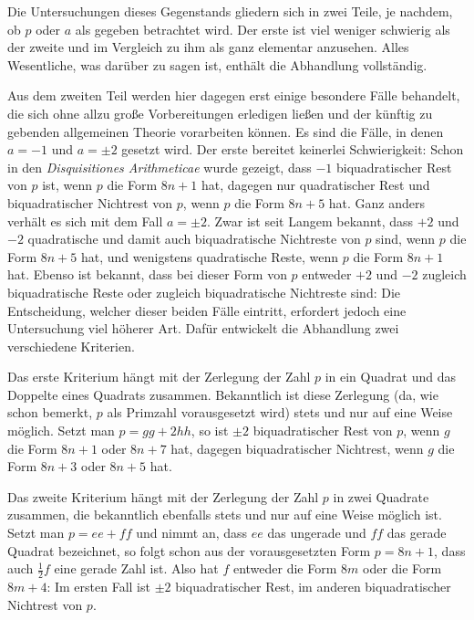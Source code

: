 Die Untersuchungen dieses Gegenstands gliedern sich in zwei Teile, je nachdem, ob $p$ oder $a$ als gegeben betrachtet wird. Der erste ist viel weniger schwierig als der zweite und im Vergleich zu ihm als ganz elementar anzusehen. Alles Wesentliche, was darüber zu sagen ist, enthält die Abhandlung vollständig.

Aus dem zweiten Teil werden hier dagegen erst einige besondere Fälle behandelt, die sich ohne allzu große Vorbereitungen erledigen ließen und der künftig zu gebenden allgemeinen Theorie vorarbeiten können. Es sind die Fälle, in denen $a=-1$ und $a=\pm2$ gesetzt wird. Der erste bereitet keinerlei Schwierigkeit: Schon in den \emph{Disquisitiones Arithmeticae} wurde gezeigt, dass $-1$ biquadratischer Rest von $p$ ist, wenn $p$ die Form $8n+1$ hat, dagegen nur quadratischer Rest und biquadratischer Nichtrest von $p$, wenn $p$ die Form $8n+5$ hat. Ganz anders verhält es sich mit dem Fall $a=\pm2$. Zwar ist seit Langem bekannt, dass $+2$ und $-2$ quadratische und damit auch biquadratische Nichtreste von $p$ sind, wenn $p$ die Form $8n+5$ hat, und wenigstens quadratische Reste, wenn $p$ die Form $8n+1$ hat. Ebenso ist bekannt, dass bei dieser Form von $p$ entweder $+2$ und $-2$ zugleich biquadratische Reste oder zugleich biquadratische Nichtreste sind:
%
Die Entscheidung, welcher dieser beiden Fälle eintritt, erfordert jedoch eine Untersuchung viel höherer Art. Dafür entwickelt die Abhandlung zwei verschiedene Kriterien.

Das erste Kriterium hängt mit der Zerlegung der Zahl $p$ in ein Quadrat und das Doppelte eines Quadrats zusammen. Bekanntlich ist diese Zerlegung (da, wie schon bemerkt, $p$ als Primzahl vorausgesetzt wird) stets und nur auf eine Weise möglich. Setzt man $p=gg+2hh$, so ist $\pm2$ biquadratischer Rest von $p$, wenn $g$ die Form $8n+1$ oder $8n+7$ hat, dagegen biquadratischer Nichtrest, wenn $g$ die Form $8n+3$ oder $8n+5$ hat.

Das zweite Kriterium hängt mit der Zerlegung der Zahl $p$ in zwei Quadrate zusammen, die bekanntlich ebenfalls stets und nur auf eine Weise möglich ist. Setzt man $p=ee+ff$ und nimmt an, dass $ee$ das ungerade und $ff$ das gerade Quadrat bezeichnet, so folgt schon aus der vorausgesetzten Form $p=8n+1$, dass auch $\frac12f$ eine gerade Zahl ist. Also hat $f$ entweder die Form $8m$ oder die Form $8m+4$: Im ersten Fall ist $\pm2$ biquadratischer Rest, im anderen biquadratischer Nichtrest von $p$.

